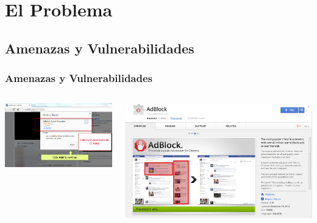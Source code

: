 \documentclass[serif,9pt]{beamer}
\begin{document}
\section{El Problema}
\subsection{Amenazas y Vulnerabilidades}
\begin{frame}
	\frametitle{Amenazas y Vulnerabilidades}
	\begin{columns}
	\begin{minipage}[c][0.4\textheight][c]{\linewidth}
	  \centering
	  \includegraphics[scale=0.3]{figures/fbporn3.png}
	  \label{fig:Malware}
	\end{minipage}
	\begin{minipage}[c][0.4\textheight][c]{\linewidth}
	  \centering
	  \includegraphics[scale=0.10]{figures/Adblock.png}
	  \label{fig:vulnExt}
	\end{minipage}
	\begin{minipage}[c][0.4\textheight][c]{\linewidth}

\end{minipage}
\end{columns}
\end{frame}
\end{document}
